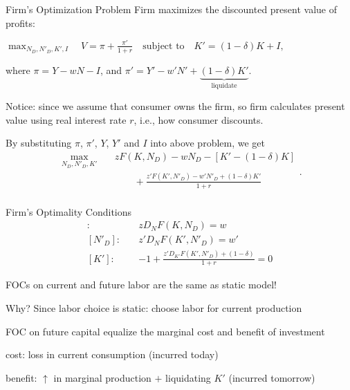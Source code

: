 \documentclass[11pt,aspectratio=169,usenames,dvipsnames]{beamer}
\let\tempone\itemize
\let\temptwo\enditemize
\renewenvironment{itemize}{\tempone\addtolength{\itemsep}{\fill}}{\temptwo}
\begin{document}
\begin{frame}{Firm's Optimization Problem}
\label{slide:Firm_s_Optimization_Problem}
    Firm maximizes the discounted present value of profits:
    \begin{center}
        $ \displaystyle \max_{N_{D}, N'_{D}, K', I} \quad V = \pi + \frac{\pi' }{1+r} \quad \text{subject to} \quad K' = ( 1-\delta )K + I,$
    \end{center}
    where $ \pi = Y - wN - I $, and $ \pi' = Y' - w'N' + \underbrace{( 1-\delta )K'}_{\text{liquidate}} $.

    Notice: since we assume that \alert{consumer owns the firm}, so firm calculates present value using \alert{real interest rate $ r $}, i.e., how consumer discounts.

    By substituting $ \pi $, $ \pi' $, $ Y $, $ Y' $ and $ I $ into above problem, we get
    \begin{equation}
    \label{eq:firm_problem}
        \begin{split}
            \max_{N_{D}, N'_{D}, K'} \quad
                & z F( K, N_{D} ) - w N_{D} - [ K' - ( 1-\delta )K ]
            \\
                & \qquad + \frac{z' F( K', N'_{D} ) - w' N'_{D} + ( 1-\delta ) K'}{1+r}
            \\
        \end{split}
    .\end{equation}
\end{frame}

\begin{frame}{Firm's Optimality Conditions}
\label{slide:Firm_s_Optimality_Conditions}
    \begin{align*}
        [ N_{D} ]: \quad
            & z D_{N}F( K, N_{D} ) = w
        \\
        [ N'_{D} ]: \quad
            & z' D_{N}F( K', N'_{D} ) = w'
        \\
        [ K' ]: \quad
            & -1 + \frac{z' D_{K'} F( K', N'_{D} ) + (1-\delta)}{1+r} = 0
    \end{align*}
    \begin{itemize}
        \item FOCs on current and future labor are \alert{the same} as static model!
        \begin{itemize}
            \item Why? Since labor choice is \alert{static}: choose labor for \alert{current} production
        \end{itemize}
        \item FOC on future capital equalize the \alert{marginal cost and benefit} of investment
        \begin{itemize}
            \item cost: loss in current consumption (incurred today)
            \item benefit: $ \uparrow  $ in marginal production $ + $ liquidating $ K' $ (incurred tomorrow)
        \end{itemize}
    \end{itemize}
\end{frame}
\end{document}
